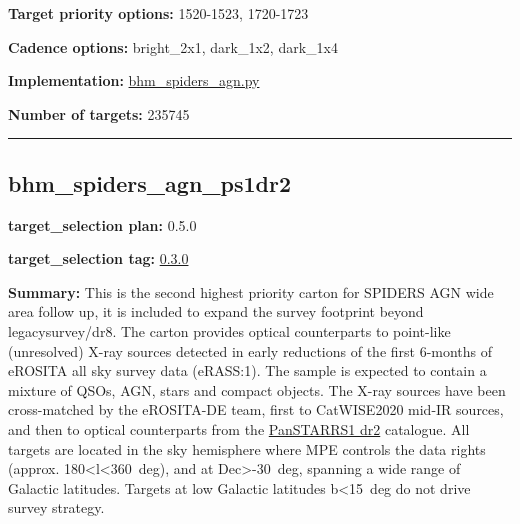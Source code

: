 \noindent\textbf{Target priority options:} 1520-1523, 1720-1723

\noindent\textbf{Cadence options:} bright\_2x1, dark\_1x2, dark\_1x4

\noindent\textbf{Implementation:}
\href{https://github.com/sdss/target_selection/blob/0.3.0/python/target_selection/cartons/bhm_spiders_agn.py}{bhm\_spiders\_agn.py}

\noindent\textbf{Number of targets:} 235745

\begin{center}\rule{0.5\linewidth}{0.5pt}\end{center}

\hypertarget{bhm_spiders_agn_ps1dr2_plan0.5.0}{%
\subsection{bhm\_spiders\_agn\_ps1dr2}\label{bhm_spiders_agn_ps1dr2_plan0.5.0}}

\noindent\textbf{target\_selection plan:} 0.5.0

\noindent\textbf{target\_selection tag:}
\href{https://github.com/sdss/target_selection/tree/0.3.0/}{0.3.0}

\noindent\textbf{Summary:} This is the second highest priority carton for SPIDERS
AGN wide area follow up, it is included to expand the survey footprint
beyond legacysurvey/dr8. The carton provides optical counterparts to
point-like (unresolved) X-ray sources detected in early reductions of
the first 6-months of eROSITA all sky survey data (eRASS:1). The sample
is expected to contain a mixture of QSOs, AGN, stars and compact
objects. The X-ray sources have been cross-matched by the eROSITA-DE
team, first to
CatWISE2020 \citep{Marocco2021}
mid-IR sources, and then to optical counterparts from the
\href{https://outerspace.stsci.edu/display/PANSTARRS/}{PanSTARRS1 dr2}
catalogue. All targets are located in the sky hemisphere where MPE
controls the data rights (approx. 180\textless{}l\textless{}360~deg),
and at Dec\textgreater{}-30~deg, spanning a wide range of Galactic
latitudes. Targets at low Galactic latitudes
\textbar{}b\textbar{}\textless{}15~deg do not drive survey strategy.

